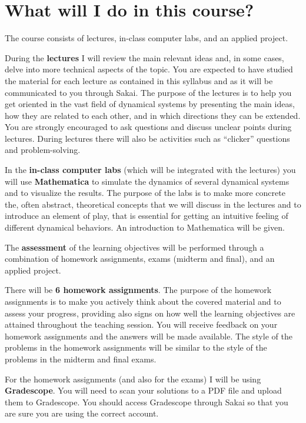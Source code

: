\documentclass[11pt]{article}
\begin{document}


\section{What will I do in this course?}

The course consists of lectures, in-class computer labs, and an applied project. 

During the \textbf{lectures} I will review the main relevant ideas and, in some cases, delve into more technical aspects of the topic. You are expected to have studied the material for each lecture as contained in this syllabus and as it will be communicated to you through Sakai. The purpose of the lectures is to help you get oriented in the vast field of dynamical systems by presenting the main ideas, how they are related to each other, and in which directions they can be extended. You are strongly encouraged to ask questions and discuss unclear points during lectures. During lectures there will also be activities such as “clicker” questions and problem-solving.

In the \textbf{in-class computer labs} (which will be integrated with the lectures) you will use \textbf{Mathematica} to simulate the dynamics of several dynamical systems and to visualize the results. The purpose of the labs is to make more concrete the, often abstract, theoretical concepts that we will discuss in the lectures and to introduce an element of play, that is essential for getting an intuitive feeling of different dynamical behaviors. An introduction to Mathematica will be given. 

The \textbf{assessment} of the learning objectives will be performed through a combination of homework assignments, exams (midterm and final), and an applied project. %

There will be \textbf{6 homework assignments}. The purpose of the homework assignments is to make you actively think about the covered material and to assess your progress, providing also signs on how well the learning objectives are attained throughout the teaching session. You will receive feedback on your homework assignments and the answers will be made available. The style of the problems in the homework assignments will be similar to the style of the problems in the midterm and final exams.

For the homework assignments (and also for the exams) I will be using \textbf{Gradescope}. You will need to scan your solutions to a PDF file and upload them to Gradescope. You should access Gradescope through Sakai so that you are sure you are using the correct account.
\end{document}
